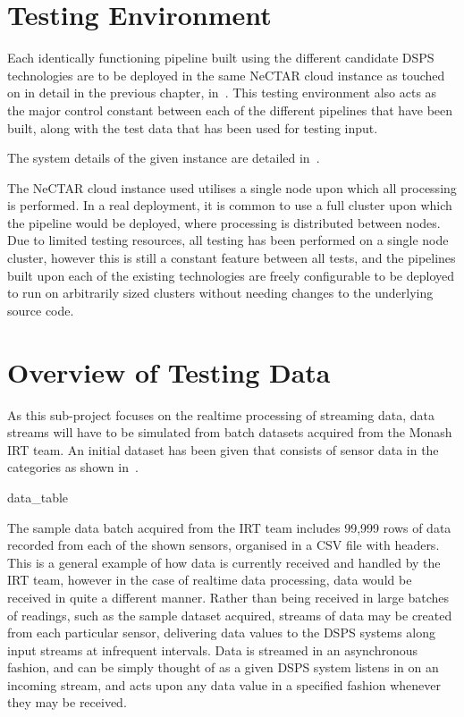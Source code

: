 \section{Testing Environment} %
\label{sub:testing_environment}

Each identically functioning pipeline built using the different candidate DSPS technologies are to be deployed in the
same NeCTAR cloud instance as touched on in detail in the previous chapter, in~.
This testing environment also acts as the major control constant between each of the different pipelines that have been
built, along with the test data that has been used for testing input.

The system details of the given instance are detailed in~.

The NeCTAR cloud instance used utilises a single node upon which all processing is performed. In a real deployment, it is
common to use a full cluster upon which the pipeline would be deployed, where processing is distributed between nodes. Due to
limited testing resources, all testing
has been performed on a single node cluster, however this is still a constant feature between all tests, and the pipelines built upon
each of the existing technologies are freely configurable to be deployed to run on arbitrarily sized clusters without
needing changes to the underlying source code.



\section{Overview of Testing Data} %
\label{sub:overview_of_test_data}

As this sub-project focuses on the realtime processing of streaming data, data streams will have to be simulated from
batch datasets acquired from the Monash IRT team. An initial dataset has been given that consists of sensor data in the
categories as shown in~.

{data_table}

The sample data batch acquired from the IRT team includes 99,\@999 rows of data recorded from each of the shown sensors,
organised in a CSV file with headers. This is a general example of how data is currently received and handled by the IRT
team, however in the case of realtime data processing, data would be received in quite a different manner. Rather than
being received in large batches of readings, such as the sample dataset acquired, streams of data may be created from
each particular sensor, delivering data values to the DSPS systems along input streams at infrequent intervals. Data
is streamed in an asynchronous fashion, and can be simply thought of as a given DSPS system listens in on an incoming stream, and
acts upon any data value in a specified fashion whenever they may be received.


